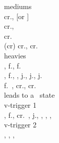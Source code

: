 \documentclass[a4paper,9pt,twocolumn]{letter}
\begin{document}
\smallbreak
\noindent
mediums \\
cr.\mkick\cancel\qcb\lkick, [\lkick or \mkick] \\
cr.\mkick\cancel\qcb\exkick,\dragonpunch\hkick \\
cr.\mkick\cancel\dragonpunch\hkick \\
(cr) cr.\mkick\cancel\qcb\mpunch, cr.\lpunch\cancel\dragonpunch\hkick \\

\vfill\eject
\noindent
heavies \\
\hpunch, f.\hpunch, f.\hpunch\cancel\vsone \\
\hpunch, f.\hpunch\cancel\vstwo, \up, j.\mpunch, j.\hpunch, j.\hkick\cancel\qcf\expunch \\
f.\hpunch\ \crush, cr.\mpunch\cancel\qcb\mpunch, cr.\lpunch\cancel\dragonpunch\hkick \\
\vsone\air\qcf\anypunch leads to a \crush\ state \\

\smallbreak
\noindent
v-trigger 1 \\
\hpunch, f.\hpunch\cancel\vtone, cr.\hpunch\ \back\back, j.\hkick, \qcb\hkick, \hkick, \qcb\expunch, \dragonpunch\exkick \\
v-trigger 2 \\
\hkick\cancel\vttwo\cancel\anykick, \anypunch, \anykick, \qcb\expunch \\
\end{document}
